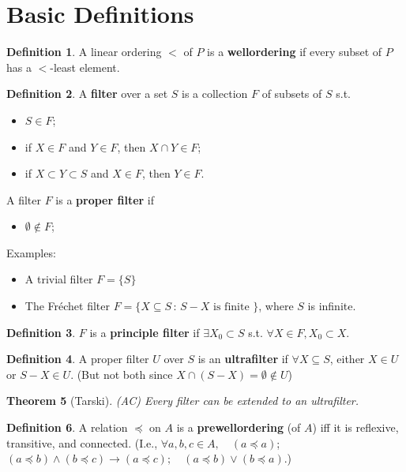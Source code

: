 \documentclass[bibother]{asl}
\newtheorem{thm}{Theorem}[section]
\theoremstyle{definition}
\newtheorem{defn}[thm]{Definition}
\theoremstyle{remark}
\begin{document}
\section{Basic Definitions}


\begin{defn}
A linear ordering $<$ of $P$ is a \textbf{wellordering} if every subset of $P$ has a $<$-least element. 
\end{defn}



\begin{defn}
A \textbf{filter} over a set $S$  is a collection $F$ of subsets of $S$ s.t.
\begin{itemize}
\item[1)] $S\in F$;
\item[2)] if $X\in F$ and $Y\in F$, then $X\cap Y\in F$;
\item[3)] if $X \subset Y \subset S$ and $X\in F$, then $Y\in F$.
\end{itemize} 
A filter $F$ is a \textbf{proper filter} if
\begin{itemize}
\item[4)] $\emptyset\notin F$;
\end{itemize} 
\end{defn}

Examples:
\begin{itemize}
\item[(e1)] A trivial filter $F=\{S\}$
\item[(e2)] The Fr\'{e}chet filter $F=\{X\subseteq S\, :\, S-X \textrm{ is finite } \}$, where $S$ is infinite.
\end{itemize} 


\begin{defn}$F$ is a \textbf{principle filter} if $\exists X_0\subset  S$ s.t. 
$\forall X\in F, X_0\subset X$.
\end{defn}

\begin{defn}
A proper filter $U$ over $S$ is an \textbf{ultrafilter} if $\forall X\subseteq  S$,
either  $X\in U$ or  $S-X\in U$. (But not both since $X\cap (S-X)=\emptyset\notin U$)
\end{defn}

\begin{thm}[Tarski]
(AC) Every filter can be extended to an ultrafilter.
\end{thm}


\begin{defn}
A relation $\preceq$ on $A$ is a \textbf{prewellordering} (of $A$) iff it is reflexive, transitive, and connected. (I.e., $\forall a,b,c\in A, \quad (a\preceq a)$;\quad  $(a\preceq b) \land (b \preceq c) \to (a\preceq c); \quad   (a\preceq b) \lor (b\preceq a)$.)
\end{defn}
\end{document}
